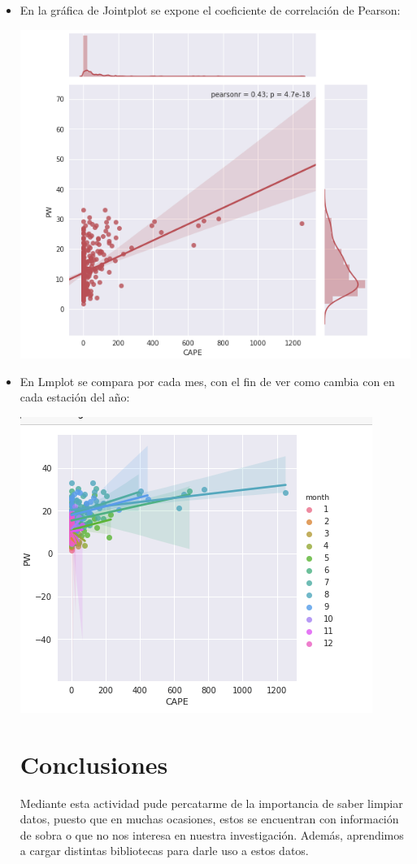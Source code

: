 \documentclass{article}
\begin{document}
\begin{doublespace}
\begin{itemize}
\item En la gráfica de Jointplot se expone el coeficiente de correlación de Pearson:
\begin{center}
\includegraphics[scale=0.5]{act59.png}
\end{center}

\item En Lmplot se compara por cada mes, con el fin de ver como cambia con en cada estación del año:
\begin{center}
\includegraphics[scale=0.5]{act510.png}
\end{center}

\section{Conclusiones}
Mediante esta actividad pude percatarme de la importancia de saber limpiar datos, puesto que en muchas ocasiones, estos se encuentran con información de sobra o que no nos interesa en nuestra investigación. Además, aprendimos a cargar distintas bibliotecas para darle uso a estos datos.


\end{itemize}
\end{doublespace}
\end{document}
